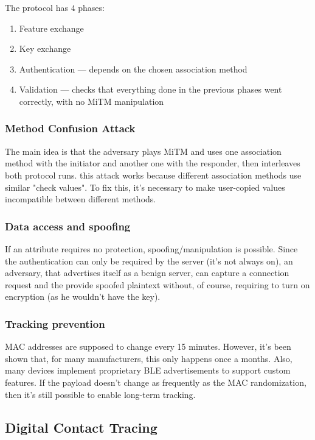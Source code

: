 \newpage

The protocol has $4$ phases:
\begin{enumerate}
	\item Feature exchange
	\item Key exchange
	\item Authentication --- depends on the chosen association method
	\item Validation --- checks that everything done in the previous phases went correctly, with no MiTM manipulation
\end{enumerate}

\subsubsection{Method Confusion Attack}
The main idea is that the adversary plays MiTM and uses one association method with the initiator and another one with the responder, then interleaves both protocol runs. this attack works because different association methods use similar "check values". To fix this, it's necessary to make user-copied values incompatible between different methods.

\subsubsection{Data access and spoofing}
If an attribute requires no protection, spoofing/manipulation is possible. Since the authentication can only be required by the server (it's not always on), an adversary, that advertises itself as a benign server, can capture a connection request and the provide spoofed plaintext without, of course, requiring to turn on encryption (as he wouldn't have the key).

\subsubsection{Tracking prevention}
MAC addresses are supposed to change every 15 minutes. However, it's been shown that, for many manufacturers, this only happens once a months.
Also, many devices implement proprietary BLE advertisements to support custom features. If the payload doesn't change as frequently as the MAC randomization, then it's still possible to enable long-term tracking.

\subsection{Digital Contact Tracing}

